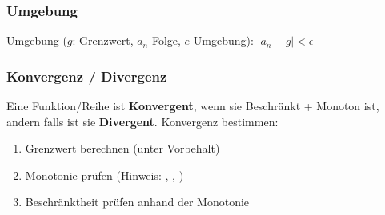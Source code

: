 \subsubsection{Umgebung}
Umgebung ($g$: Grenzwert, $a_n$ Folge, $e$ Umgebung): $\left|a_n - g\right| < \epsilon$


\subsubsection{Konvergenz / Divergenz}
Eine Funktion/Reihe ist \textbf{Konvergent}, wenn sie Beschränkt + Monoton ist, andern falls ist sie \textbf{Divergent}.
Konvergenz bestimmen:
\begin{enumerate}[nosep]
	\item Grenzwert berechnen (unter Vorbehalt)
	\item Monotonie prüfen (\underline{Hinweis}: , , )
	\item Beschränktheit prüfen anhand der Monotonie
\end{enumerate}

